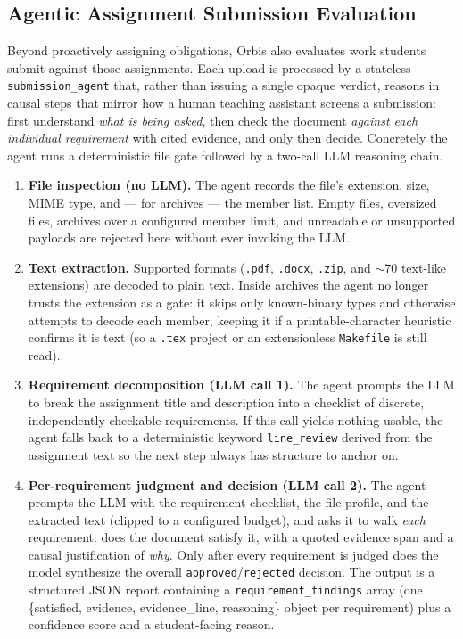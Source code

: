 \documentclass[a4paper,12pt]{article}
\begin{document}
\subsection{Agentic Assignment Submission Evaluation}
Beyond proactively assigning obligations, Orbis also evaluates work students submit against those assignments. Each upload is processed by a stateless \texttt{submission\_agent} that, rather than issuing a single opaque verdict, reasons in causal steps that mirror how a human teaching assistant screens a submission: first understand \emph{what is being asked}, then check the document \emph{against each individual requirement} with cited evidence, and only then decide. Concretely the agent runs a deterministic file gate followed by a two-call LLM reasoning chain.

\begin{enumerate}
    \item \textbf{File inspection (no LLM).} The agent records the file's extension, size, MIME type, and --- for archives --- the member list. Empty files, oversized files, archives over a configured member limit, and unreadable or unsupported payloads are rejected here without ever invoking the LLM.
    \item \textbf{Text extraction.} Supported formats (\texttt{.pdf}, \texttt{.docx}, \texttt{.zip}, and ${\sim}70$ text-like extensions) are decoded to plain text. Inside archives the agent no longer trusts the extension as a gate: it skips only known-binary types and otherwise attempts to decode each member, keeping it if a printable-character heuristic confirms it is text (so a \texttt{.tex} project or an extensionless \texttt{Makefile} is still read).
    \item \textbf{Requirement decomposition (LLM call 1).} The agent prompts the LLM to break the assignment title and description into a checklist of discrete, independently checkable requirements. If this call yields nothing usable, the agent falls back to a deterministic keyword \texttt{line\_review} derived from the assignment text so the next step always has structure to anchor on.
    \item \textbf{Per-requirement judgment and decision (LLM call 2).} The agent prompts the LLM with the requirement checklist, the file profile, and the extracted text (clipped to a configured budget), and asks it to walk \emph{each} requirement: does the document satisfy it, with a quoted evidence span and a causal justification of \emph{why}. Only after every requirement is judged does the model synthesize the overall \texttt{approved}/\texttt{rejected} decision. The output is a structured JSON report containing a \texttt{requirement\_findings} array (one \{satisfied, evidence, evidence\_line, reasoning\} object per requirement) plus a confidence score and a student-facing reason.
\end{enumerate}
\end{document}
